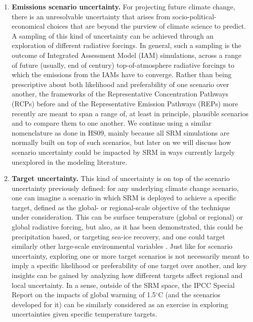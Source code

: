 \documentclass[draft]{agujournal2019}
\begin{document}
\begin{enumerate}
    \item \textbf{Emissions scenario uncertainty.} For projecting future climate change, there is an unresolvable uncertainty that arises from socio-political-economical choices that are beyond the purview of climate science to predict. A sampling of this kind of uncertainty can be achieved through an exploration of different radiative forcings. In general, such a sampling is the outcome of Integrated Assessment Model (IAM) simulations, across a range of future (usually, end of century) top-of-atmosphere radiative forcings to which the emissions from the IAMs have to converge. Rather than being prescriptive about both likelihood and preferability of one scenario over another, the frameworks of the Representative Concentration Pathways (RCPs) before and of the Representative Emission Pathways (REPs) more recently are meant to span a range of, at least in principle, plausible scenarios and to compare them to one another. We continue using a similar nomenclature as done in HS09, mainly because all SRM simulations are normally built on top of such scenarios, but later on we will discuss how scenario uncertainty could be impacted by SRM in ways currently largely unexplored in the modeling literature.

    \item \textbf{Target uncertainty.} This kind of uncertainty is on top of the scenario uncertainty previously defined: for any underlying climate change scenario, one can imagine a scenario in which SRM is deployed to achieve a specific target, defined as the global- or regional-scale objective of the technique under consideration. This can be surface temperature (global or regional) or global radiative forcing, but also, as it has been demonstrated, this could be precipitation based, or targeting sea-ice recovery, and one could target similarly other large-scale environmental variables \cite{Lee-etal-2020}. Just like for scenario uncertainty, exploring one or more target scenarios is not necessarily meant to imply a specific likelihood or preferability of one target over another, and key insights can be gained by analyzing how different targets affect regional and local uncertainty. In a sense, outside of the SRM space, the IPCC Special Report on the impacts of global warming of 1.5$^{\circ}$C \cite{IPCC_2018_SR15} (and the scenarios developed for it) can be similarly considered as an exercise in exploring uncertainties given specific temperature targets.


\end{enumerate}
\end{document}
